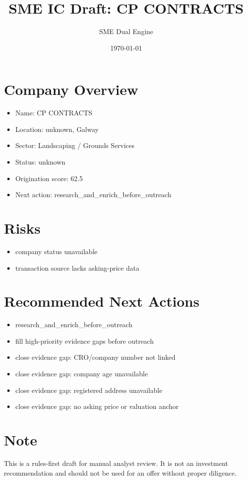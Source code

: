 \documentclass[11pt,a4paper]{article}
\title{SME IC Draft: CP CONTRACTS}
\author{SME Dual Engine}
\date{\today}
\begin{document}
\maketitle
\section*{Company Overview}
\begin{itemize}[leftmargin=1.4em]
\item Name: CP CONTRACTS
\item Location: unknown, Galway
\item Sector: Landscaping / Grounds Services
\item Status: unknown
\item Origination score: 62.5
\item Next action: research\_and\_enrich\_before\_outreach
\end{itemize}
\section*{Risks}
\begin{itemize}[leftmargin=1.4em]
\item company status unavailable
\item transaction source lacks asking-price data
\end{itemize}
\section*{Recommended Next Actions}
\begin{itemize}[leftmargin=1.4em]
\item research\_and\_enrich\_before\_outreach
\item fill high-priority evidence gaps before outreach
\item close evidence gap: CRO/company number not linked
\item close evidence gap: company age unavailable
\item close evidence gap: registered address unavailable
\item close evidence gap: no asking price or valuation anchor
\end{itemize}
\section*{Note}
This is a rules-first draft for manual analyst review. It is not an investment
recommendation and should not be used for an offer without proper diligence.
\end{document}
